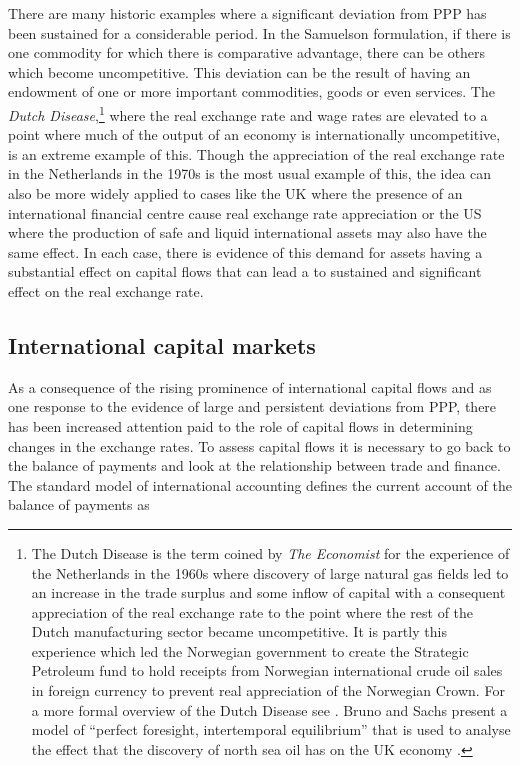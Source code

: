 \documentclass[12pt, a4paper, oneside]{article}\usepackage[]{graphicx}\usepackage[]{color}
\begin{document}
There are many historic examples where a significant deviation from PPP has been sustained for a considerable period.  In the Samuelson formulation, if there is one commodity for which there is comparative advantage, there can be others which become uncompetitive.  This deviation can be the result of having an endowment of one or more important commodities, goods or even services.  The \emph{Dutch Disease},\footnote{The Dutch Disease is the term coined by \emph{The Economist} for the experience of the Netherlands in the 1960s where discovery of large natural gas fields led to an increase in the trade surplus and some inflow of capital with a consequent appreciation of the real exchange rate to the point where the rest of the Dutch manufacturing sector became uncompetitive.  It is partly this experience which led the Norwegian government to create the Strategic Petroleum fund to hold receipts from Norwegian international crude oil sales in foreign currency to prevent real appreciation of the Norwegian Crown.  For a more formal overview of the Dutch Disease see \citep{CordenNeary}. Bruno and Sachs present a model of ``perfect foresight, intertemporal equilibrium''  that is used to analyse the effect that the discovery of north sea oil has on the UK economy \citep[p. 846]{SachsDutch}.} where the real exchange rate and wage rates are elevated to a point where much of the output of an economy is internationally uncompetitive, is an extreme example of this.  Though the appreciation of the real exchange rate in the Netherlands in the 1970s is the most usual example of this, the idea can also be more widely applied to cases like the UK where the presence of an international financial centre cause real exchange rate appreciation or the US where the production of safe and liquid international assets may also have the same effect.  In each case, there is evidence of this demand for assets having a substantial effect on capital flows that can lead a to sustained and significant effect on the real exchange rate.  
  
\subsection{International capital markets}
As a consequence of the rising prominence of international capital flows and as one response to the evidence of large and persistent deviations from PPP, there has been increased attention paid to the role of capital flows in determining  changes in the exchange rates.  To assess capital flows it is necessary to go back to the balance of payments and look at the relationship between trade and finance.  The standard model of international accounting defines the current account of the balance of payments as   
\end{document}
